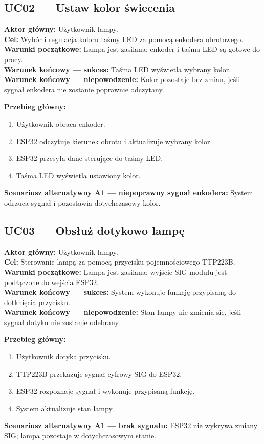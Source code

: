 \subsection*{UC02 — Ustaw kolor świecenia}
\textbf{Aktor główny:} Użytkownik lampy.\\
\textbf{Cel:} Wybór i regulacja koloru taśmy LED za pomocą enkodera obrotowego.\\
\textbf{Warunki początkowe:} Lampa jest zasilana; enkoder i taśma LED są gotowe do pracy.\\
\textbf{Warunek końcowy — sukces:} Taśma LED wyświetla wybrany kolor.\\
\textbf{Warunek końcowy — niepowodzenie:} Kolor pozostaje bez zmian, jeśli sygnał enkodera nie zostanie poprawnie odczytany.

\textbf{Przebieg główny:}
\begin{enumerate}
\item Użytkownik obraca enkoder.
\item ESP32 odczytuje kierunek obrotu i aktualizuje wybrany kolor.
\item ESP32 przesyła dane sterujące do taśmy LED.
\item Taśma LED wyświetla ustawiony kolor.
\end{enumerate}
\textbf{Scenariusz alternatywny A1 — niepoprawny sygnał enkodera:} System odrzuca sygnał i pozostawia dotychczasowy kolor.

\subsection*{UC03 — Obsłuż dotykowo lampę}
\textbf{Aktor główny:} Użytkownik lampy.\\
\textbf{Cel:} Sterowanie lampą za pomocą przycisku pojemnościowego TTP223B.\\
\textbf{Warunki początkowe:} Lampa jest zasilana; wyjście SIG modułu jest podłączone do wejścia ESP32.\\
\textbf{Warunek końcowy — sukces:} System wykonuje funkcję przypisaną do dotknięcia przycisku.\\
\textbf{Warunek końcowy — niepowodzenie:} Stan lampy nie zmienia się, jeśli sygnał dotyku nie zostanie odebrany.

\textbf{Przebieg główny:}
\begin{enumerate}
\item Użytkownik dotyka przycisku.
\item TTP223B przekazuje sygnał cyfrowy SIG do ESP32.
\item ESP32 rozpoznaje sygnał i wykonuje przypisaną funkcję.
\item System aktualizuje stan lampy.
\end{enumerate}
\textbf{Scenariusz alternatywny A1 — brak sygnału:} ESP32 nie wykrywa zmiany SIG; lampa pozostaje w dotychczasowym stanie.